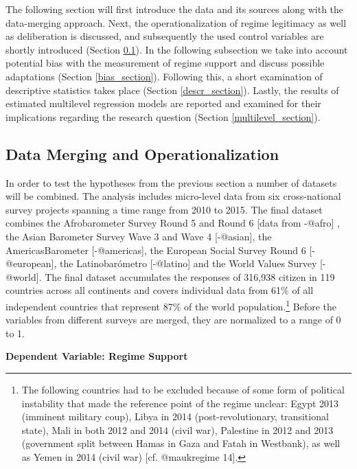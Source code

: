 \documentclass[]{article}
\title{}
\author{}
\date{}
\let\rmarkdownfootnote\footnote%
\def\footnote{\protect\rmarkdownfootnote}
\begin{document}
The following section will first introduce the data and its sources
along with the data-merging approach. Next, the operationalization of
regime legitimacy as well as deliberation is discussed, and subsequently
the used control variables are shortly introduced (Section
\ref{data_section}). In the following subsection we take into account
potential bias with the measurement of regime support and discuss
possible adaptations (Section \ref{bias_section}). Following this, a
short examination of descriptive statistics takes place (Section
\ref{descr_section}). Lastly, the results of estimated multilevel
regression models are reported and examined for their implications
regarding the research question (Section \ref{multilevel_section}).

\subsection{Data Merging and Operationalization} \label{data_section}

In order to test the hypotheses from the previous section a number of
datasets will be combined. The analysis includes micro-level data from
six cross-national survey projects spanning a time range from 2010 to
2015. The final dataset combines the Afrobarometer Survey Round 5 and
Round 6 {[}data from -@afro{]} , the Asian Barometer Survey Wave 3 and
Wave 4 {[}-@asian{]}, the AmericasBarometer {[}-@americas{]}, the
European Social Survey Round 6 {[}-@european{]}, the Latinobarómetro
{[}-@latino{]} and the World Values Survey {[}-@world{]}. The final
dataset accumulates the responses of 316,938 citizen in 119 countries
across all continents and covers individual data from 61\% of all
independent countries that represent 87\% of the world
population.\footnote{The following countries had to be excluded because
  of some form of political instability that made the reference point of
  the regime unclear: Egypt 2013 (imminent military coup), Libya in 2014
  (post-revolutionary, transitional state), Mali in both 2012 and 2014
  (civil war), Palestine in 2012 and 2013 (government split between
  Hamas in Gaza and Fatah in Westbank), as well as Yemen in 2014 (civil
  war) {[}cf. @maukregime 14{]}.} Before the variables from different
surveys are merged, they are normalized to a range of 0 to 1.

\noindent 

\begin{footnotesize}
\textbf{Dependent Variable: Regime Support}\end{footnotesize}
\end{document}
